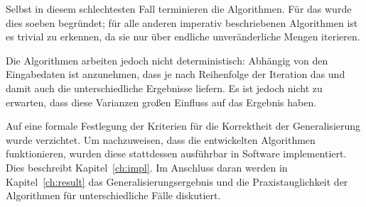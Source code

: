 \documentclass[../main/thesis.tex]{subfiles}
\begin{document}
Selbst in diesem schlechtesten Fall terminieren die Algorithmen.
Für das  wurde dies soeben begründet; für alle anderen imperativ beschriebenen Algorithmen ist es trivial zu erkennen, da sie nur über endliche unveränderliche Mengen iterieren.

Die Algorithmen arbeiten jedoch nicht deterministisch:
Abhängig von den Eingabedaten ist anzunehmen, dass je nach Reihenfolge der Iteration das  und damit auch die  unterschiedliche Ergebnisse liefern.
Es ist jedoch nicht zu erwarten, dass diese Varianzen großen Einfluss auf das Ergebnis haben.


Auf eine formale Festlegung der Kriterien für die Korrektheit der Generalisierung wurde verzichtet.
Um nachzuweisen, dass die entwickelten Algorithmen funktionieren, wurden diese stattdessen ausführbar in Software implementiert.
Dies beschreibt Kapitel~\ref{ch:impl}.
Im Anschluss daran werden in Kapitel~\ref{ch:result} das Generalisierungsergebnis und die Praxistauglichkeit der Algorithmen für unterschiedliche Fälle diskutiert.
\end{document}
